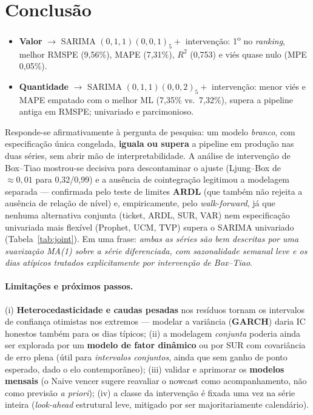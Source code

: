 \documentclass[11pt,a4paper]{article}
\begin{document}
\section{Conclusão}
\label{sec:conc}

\begin{itemize}\setlength\itemsep{2pt}
\item \textbf{Valor} $\to$ SARIMA $(0,1,1)(0,0,1)_5 +$ intervenção: 1\textsuperscript{o} no
\emph{ranking}, melhor RMSPE (9,56\%), MAPE (7,31\%), $R^2$ (0,753) e viés quase nulo (MPE 0,05\%).
\item \textbf{Quantidade} $\to$ SARIMA $(0,1,1)(0,0,2)_5 +$ intervenção: menor viés e MAPE
empatado com o melhor ML (7,35\% vs.\ 7,32\%), supera a pipeline antiga em RMSPE; univariado e
parcimonioso.
\end{itemize}

\noindent
Responde-se afirmativamente à pergunta de pesquisa: um modelo \emph{branco}, com especificação
única congelada, \textbf{iguala ou supera} a pipeline em produção nas duas séries, sem abrir mão de
interpretabilidade. A análise de intervenção de Box--Tiao mostrou-se decisiva para descontaminar o
ajuste (Ljung--Box de $\approx 0{,}01$ para 0,32/0,99) e a ausência de cointegração legitimou a
modelagem separada --- confirmada pelo teste de limites \textbf{ARDL} (que também não rejeita a
ausência de relação de nível) e, empiricamente, pelo \emph{walk-forward}, já que nenhuma alternativa
conjunta (ticket, ARDL, SUR, VAR) nem especificação univariada mais flexível (Prophet, UCM, TVP)
supera o SARIMA univariado (Tabela~\ref{tab:joint}). Em uma
frase: \emph{ambas as séries são bem descritas por uma suavização MA(1) sobre a série diferenciada,
com sazonalidade semanal leve e os dias atípicos tratados explicitamente por intervenção de
Box--Tiao}.

\paragraph{Limitações e próximos passos.} (i) \textbf{Heterocedasticidade e caudas pesadas} nos
resíduos tornam os intervalos de confiança otimistas nos extremos --- modelar a variância
(\textbf{GARCH}) daria IC honestos também para os dias típicos; (ii) a modelagem \emph{conjunta}
poderia ainda ser explorada por um \textbf{modelo de fator dinâmico} ou por SUR com covariância de
erro plena (útil para \emph{intervalos conjuntos}, ainda que sem ganho de ponto esperado, dado o elo
contemporâneo); (iii) validar e aprimorar os \textbf{modelos mensais} (o Naive vencer sugere reavaliar o nowcast
como acompanhamento, não como previsão \emph{a priori}); (iv) a classe da intervenção é fixada uma
vez na série inteira (\emph{look-ahead} estrutural leve, mitigado por ser majoritariamente
calendário).
\end{document}
